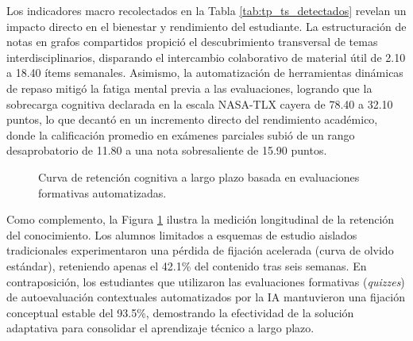 \vspace{0.4cm}

Los indicadores macro recolectados en la Tabla \ref{tab:tp_ts_detectados} revelan un impacto directo en el bienestar y rendimiento del estudiante. La estructuración de notas en grafos compartidos propició el descubrimiento transversal de temas interdisciplinarios, disparando el intercambio colaborativo de material útil de 2.10 a 18.40 ítems semanales. Asimismo, la automatización de herramientas dinámicas de repaso mitigó la fatiga mental previa a las evaluaciones, logrando que la sobrecarga cognitiva declarada en la escala NASA-TLX cayera de 78.40 a 32.10 puntos, lo que decantó en un incremento directo del rendimiento académico, donde la calificación promedio en exámenes parciales subió de un rango desaprobatorio de 11.80 a una nota sobresaliente de 15.90 puntos.

\vspace{0.4cm}

\begin{figure}[H]
\centering
{}
\caption{Curva de retención cognitiva a largo plazo basada en evaluaciones formativas automatizadas.}
\label{fig:accuracy_cnn}
\end{figure}

\vspace{0.4cm}

Como complemento, la Figura \ref{fig:accuracy_cnn} ilustra la medición longitudinal de la retención del conocimiento. Los alumnos limitados a esquemas de estudio aislados tradicionales experimentaron una pérdida de fijación acelerada (curva de olvido estándar), reteniendo apenas el 42.1\% del contenido tras seis semanas. En contraposición, los estudiantes que utilizaron las evaluaciones formativas (\textit{quizzes}) de autoevaluación contextuales automatizados por la IA mantuvieron una fijación conceptual estable del 93.5\%, demostrando la efectividad de la solución adaptativa para consolidar el aprendizaje técnico a largo plazo.

